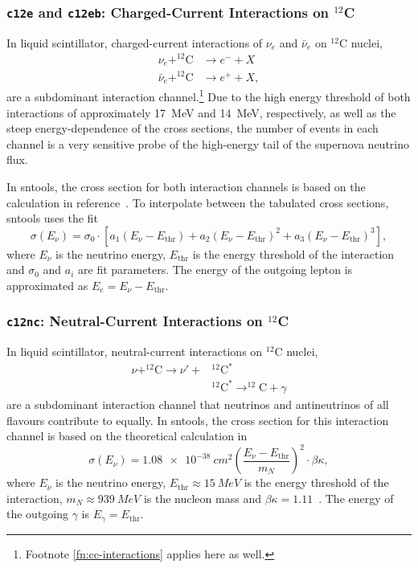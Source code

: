 \documentclass[11pt, oneside]{article}
\newcommand{\nue}{\ensuremath{\nu_e}\xspace}
\newcommand{\nuebar}{\ensuremath{\bar{\nu}_e}\xspace}
\begin{document}
\subsubsection{\texttt{c12e} and \texttt{c12eb}: Charged-Current Interactions on $^{12}$C}
In liquid scintillator, charged-current interactions of \nue and \nuebar on $^{12}$C nuclei,
\begin{align}
\nue + ^{12}\text{C} &\rightarrow e^- + X \\
\nuebar + ^{12}\text{C} &\rightarrow e^+ + X,
\end{align}
are a subdominant interaction channel.\footnote{Footnote \ref{fn:cc-interactions} applies here as well.}
Due to the high energy threshold of both interactions of approximately \SI{17}{MeV} and \SI{14}{MeV}, respectively, as well as the steep energy-dependence of the cross sections, the number of events in each channel is a very sensitive probe of the high-energy tail of the supernova neutrino flux.

In sntools, the cross section for both interaction channels is based on the calculation in reference~\cite{Kolbe1999}.
To interpolate between the tabulated cross sections, sntools uses the fit
\begin{equation}
\sigma (E_\nu) = \sigma_0 \cdot \left[ a_1 (E_\nu - E_\text{thr}) + a_2 (E_\nu - E_\text{thr})^2 + a_3 (E_\nu - E_\text{thr})^3 \right],
\end{equation}
where $E_\nu$ is the neutrino energy, $E_\text{thr}$ is the energy threshold of the interaction and $\sigma_0$ and $a_i$ are fit parameters.
The energy of the outgoing lepton is approximated as $E_e = E_\nu - E_\text{thr}$.


\subsubsection{\texttt{c12nc}: Neutral-Current Interactions on $^{12}$C}
In liquid scintillator, neutral-current interactions on $^{12}$C nuclei,
\begin{align}
\nu + ^{12}\text{C} \rightarrow \nu' + &^{12}\text{C}^*\\
	&^{12}\text{C}^* \rightarrow ^{12}\text{C} + \gamma
\end{align}
are a subdominant interaction channel that neutrinos and antineutrinos of all flavours contribute to equally.
In sntools, the cross section for this interaction channel is based on the theoretical calculation in~\cite{Donnelly1979}
\begin{equation}
\sigma (E_\nu) = \SI{1.08e-38}{cm^2} \left( \frac{E_\nu - E_\text{thr}}{m_N} \right)^2 \cdot \beta \kappa,
\end{equation}
where $E_\nu$ is the neutrino energy, $E_\text{thr} \approx \SI{15}{MeV}$ is the energy threshold of the interaction, $m_N \approx \SI{939}{MeV}$ is the nucleon mass and $\beta \kappa = 1.11$~\cite{Armbruster1998}.
The energy of the outgoing $\gamma$ is $E_\gamma = E_\text{thr}$.
\end{document}
